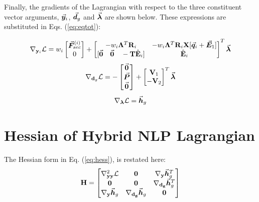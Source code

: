 \begin{appendices}

Finally, the gradients of the Lagrangian with respect to the three constituent 
vector arguments, $\vec{\bm{y}}_i$, $\vec{\bm{d}}_g$ and $\vec{\bm{\bm{\lambda}}}$ are 
shown below. These expressions are substituted in Eqs. (\ref{eq:eqtot}):

\begin{gather}
	\nabla_{\mathbf{y}_i}\mathcal{L} = w_i\begin{bmatrix}
		\bvec{F}_{sec}^{(i)} \\ 0
	\end{bmatrix} + \begin{bmatrix}
		-w_i\bmat{\Lambda}^T\bmat{R}_i & -w_i\bmat{\Lambda}^T
		\bmat{R}_i\bmat{X}[\bvec{q}_i+\bvec{E}_1]\\
		[\bvec{0}\quad \bvec{0}\quad -\bmat{T}\hat{\mathbf{E}}_i] & 
		\hat{\mathbf{E}}_i
	\end{bmatrix}^T\bvec{\lambda}
	\label{eq:A7}
\end{gather}
\begin{gather}
	\nabla_{\mathbf{d}_g}\mathcal{L} = -\begin{bmatrix}
		\vec{\bm{0}}\\ \vec{\bm{P}}\\ \vec{\bm{0}}	\end{bmatrix} + \begin{bmatrix}
		\mathbf{V}_1 \\ -\mathbf{V}_2
	\end{bmatrix}^T\vec{\bm{\lambda}}
\end{gather}
\begin{gather}
	\nabla_{\bm{\lambda}}\mathcal{L} = \vec{\bm{h}}_g
\end{gather}

\chapter{Hessian of Hybrid NLP Lagrangian}\label{appendix:B}
The Hessian form in Eq. (\ref{eq:hess}), is restated here:
\begin{gather}
	\mathbf{H} = 	\begin{bmatrix}
		\nabla^2_{\mathbf{yy}}\mathcal{L} & \mathbf{0} & 
		\nabla_{\mathbf{y}}\vec{\bm{h}}^T_g\\
		\mathbf{0} & \mathbf{0} & \nabla_{\mathbf{d_g}}\vec{\bm{h}}^T_g\\
		\nabla_{\mathbf{y}}\vec{\bm{h}}_g & \nabla_{\mathbf{d_g}}\vec{\bm{h}}_g & 
		\mathbf{0}\\
	\end{bmatrix}\nonumber
\end{gather}


\end{appendices}
